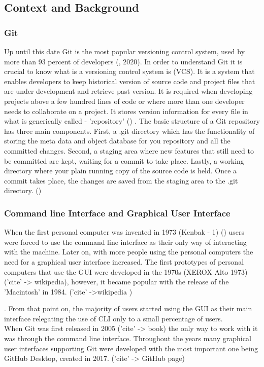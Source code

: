 \documentclass[]{report}
\begin{document}
	\subsection{Context and Background}
	
	\subsubsection{Git}
	Up until this date Git is the most popular versioning control system, used by more than 93 percent of developers (\cite{noauthor_stack_nodate}, 2020). In order to understand Git it is crucial to know what is a versioning control system is (VCS). It is a system that enables developers to keep historical version of source code and project files that are under development and retrieve past version. It is required when developing projects above a few hundred lines of code or where more than one developer needs to collaborate on a project. It stores version information for every file in what is generically called - 'repository' (\cite{ruparelia_history_2010}) . The basic structure of a Git repository has three main components. First, a .git directory which has the functionality of storing the meta data and object database for you repository and all the committed changes. Second, a staging area where new features that still need to be committed are kept, waiting for a commit to take place. Lastly, a working directory where your plain running copy of the source code is held. Once a commit takes place, the changes are saved from the staging area to the .git directory. (\cite{hultstrand_git_2015})
	
	\subsubsection{Command line Interface and Graphical User Interface}
	When the first personal computer was invented in 1973 (Kenbak - 1) (\cite{noauthor_what_nodate,}) users were forced to use the command line interface as their only way of interacting with the machine. Later on, with more people using the personal computers the need for a graphical user interface increased. The first prototypes of personal computers that use the GUI were developed in the 1970s (XEROX Alto 1973) ('cite' -> wikipedia), however, it became popular with the release of the 'Macintosh' in 1984. ('cite' ->wikipedia ) %
	
	. From that point on, the majority of users started using the GUI as their main interface relegating the use of CLI only to a small percentage of users.\\
	When Git was first released in 2005 ('cite' -> book) the only way to work with it was through the command line interface. Throughout the years many graphical user interfaces supporting Git were developed with the most important one being GitHub Desktop, created in 2017. ('cite' -> GitHub page)
	
\end{document}
